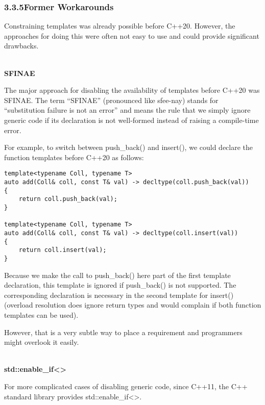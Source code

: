 \subsubsection*{ 3.3.5\hspace{0.2cm}Former Workarounds}

Constraining templates was already possible before C++20. However, the approaches for doing this were often not easy to use and could provide significant drawbacks.

\noindent
\hspace*{\fill} \\ %
\textbf{SFINAE}

The major approach for disabling the availability of templates before C++20 was SFINAE. The term “SFINAE” (pronounced like sfee-nay) stands for “substitution failure is not an error” and means the rule that we simply ignore generic code if its declaration is not well-formed instead of raising a compile-time error.

For example, to switch between push\_back() and insert(), we could declare the function templates before C++20 as follows:

\begin{lstlisting}[style=styleCXX]
template<typename Coll, typename T>
auto add(Coll& coll, const T& val) -> decltype(coll.push_back(val))
{
	return coll.push_back(val);
}

template<typename Coll, typename T>
auto add(Coll& coll, const T& val) -> decltype(coll.insert(val))
{
	return coll.insert(val);
}
\end{lstlisting}

Because we make the call to push\_back() here part of the first template declaration, this template is ignored if push\_back() is not supported. The corresponding declaration is necessary in the second template for insert() (overload resolution does ignore return types and would complain if both function templates can be used).

However, that is a very subtle way to place a requirement and programmers might overlook it easily.

\noindent
\hspace*{\fill} \\ %
\textbf{std::enable\_if<>}

For more complicated cases of disabling generic code, since C++11, the C++ standard library provides std::enable\_if<>.

